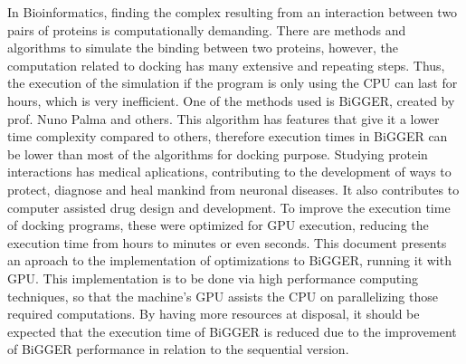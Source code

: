 In Bioinformatics, finding the complex resulting from an interaction between two pairs of proteins is computationally demanding.
There are methods and algorithms to simulate the binding between two proteins, however, the computation related to docking has many extensive and repeating steps. Thus, the execution of the simulation if the program is only using the CPU can last for hours, which is very inefficient. 
One of the methods used is BiGGER, created by prof. Nuno Palma and others.
This algorithm has features that give it a lower time complexity compared to others, therefore execution times in BiGGER can be lower than most of the algorithms for docking purpose.
Studying protein interactions has medical aplications, contributing to the development of ways to protect, diagnose and heal mankind from neuronal diseases. It also contributes to computer assisted drug design and development.
To improve the execution time of docking programs, these were optimized for GPU execution, reducing the execution time from hours to minutes or even seconds.
This document presents an aproach to the implementation of optimizations to BiGGER, running it with GPU. This implementation is to be done via high performance computing techniques, so that the machine's GPU assists the CPU on parallelizing those required computations. By having more resources at disposal, it should be expected that the execution time of BiGGER is reduced due to the improvement of BiGGER performance in relation to the sequential version.
